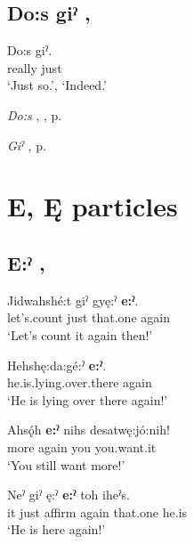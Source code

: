 \subsection*{\textbf{Do:s giˀ} , } \label{p:[do:s giˀ]}

\ea
\label{ex:dpart70}
\gll Do:s giˀ.\\
really just\\
\glt ‘Just so.’, ‘Indeed.’
\z

\begin{CayugaRelated}
\item \textit{Do:s} , , p. \pageref{p:[do:s]}\\
\item \textit{Giˀ} , p. \pageref{p:[giˀ]}
\end{CayugaRelated}

\section{E, Ę particles}

\subsection*{\textbf{E:ˀ} , } \label{p:[e:ˀ]}

\ea
\label{ex:epart1}
\gll Jidwahshé:t giˀ gyę:ˀ \textbf{e:ˀ}.\\
let’s.count just that.one again\\
\glt ‘Let’s count it again then!’
\z

\ea
\label{ex:epart2}
\gll Hehshę:da:gé:ˀ \textbf{e:ˀ}.\\
he.is.lying.over.there again\\
\glt ‘He is lying over there again!’
\z

\ea
\label{ex:epart3}
\gll Ahsǫ́h \textbf{e:ˀ} nihs desatwę:jó:nih!\\
more again you you.want.it\\
\glt ‘You still want more!’
\z

\ea
\label{ex:epart4}
\gll Neˀ giˀ ę:ˀ \textbf{e:ˀ} toh iheˀs.\\
it just affirm again that.one he.is\\
\glt ‘He is here again!’
\z

